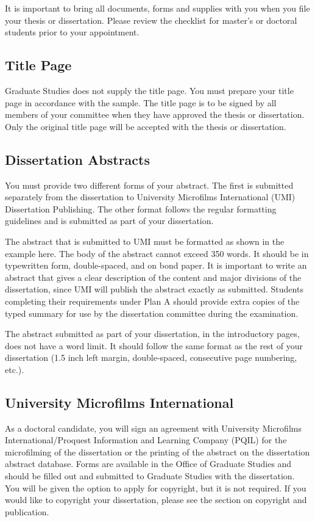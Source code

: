 It is important to bring all documents, forms and supplies with you when you file your thesis or dissertation. Please review the checklist for master's or doctoral students prior to your appointment.

\subsection{Title Page}
%
Graduate Studies does not supply the title page. You must prepare your title page in accordance with the sample. The title page is to be signed by all members of your committee when they have approved the thesis or dissertation. Only the original title page will be accepted with the thesis or dissertation.

\subsection{Dissertation Abstracts}
%
You must provide two different forms of your abstract. The first is submitted separately from the dissertation to University Microfilms International (UMI) Dissertation Publishing. The other format follows the regular formatting guidelines and is submitted as part of your dissertation.

The abstract that is submitted to UMI must be formatted as shown in the example here. The body of the abstract cannot exceed 350 words. It should be in typewritten form, double-spaced, and on bond paper. It is important to write an abstract that gives a clear description of the content and major divisions of the dissertation, since UMI will publish the abstract exactly as submitted. Students completing their requirements under Plan A should provide extra copies of the typed summary for use by the dissertation committee during the examination.

The abstract submitted as part of your dissertation, in the introductory pages, does not have a word limit. It should follow the same format as the rest of your dissertation (1.5 inch left margin, double-spaced, consecutive page numbering, etc.).

\subsection{University Microfilms International}
%
As a doctoral candidate, you will sign an agreement with University Microfilms International/Proquest Information and Learning Company (PQIL) for the microfilming of the dissertation or the printing of the abstract on the dissertation abstract database. Forms are available in the Office of Graduate Studies and should be filled out and submitted to Graduate Studies with the dissertation. You will be given the option to apply for copyright, but it is not required. If you would like to copyright your dissertation, please see the section on copyright and publication.

